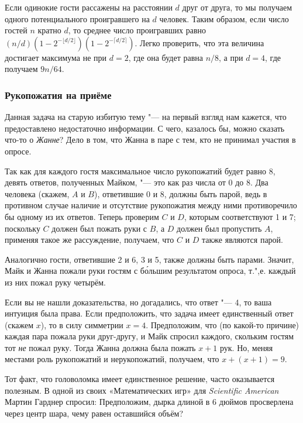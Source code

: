 \documentclass[twoside]{book}
\begin{document}
Если одинокие гости рассажены на расстоянии $d$ друг от друга, то мы получаем одного потенциального проигравшего на $d$ человек.
Таким образом, если число гостей $n$ кратно $d$, то среднее число проигравших равно $(n/d)(1-2^{-\lfloor d/2\rfloor})(1-2^{-\lceil d/2\rceil})$.
Легко проверить, что эта величина достигает максимума не при $d=2$, где она будет равна $n/8$, а при $d=4$, где получаем $9n/64$.
\heart

\subsubsection*{Рукопожатия на приёме}%

Данная задача на старую избитую тему "--- на первый взгляд нам кажется, что предоставлено недостаточно информации.
С чего, казалось бы, можно сказать что-то о \emph{Жанне}?
Дело в том, что Жанна в паре с тем, кто не принимал участия в опросе.

Так как для каждого гостя максимальное число рукопожатий будет равно 8, 
девять ответов, полученных Майком, "--- это как раз числа от 0 до 8.
Два человека (скажем, $A$ и $B$), ответившие 0 и 8, должны быть парой, ведь в противном случае наличие и отсутствие рукопожатия между ними противоречило бы одному из их ответов.
Теперь проверим $C$ и $D$, которым соответствуют 1 и 7;
поскольку $C$ должен был пожать руки с $B$, а $D$ должен был пропустить $A$, применяя такое же рассуждение, получаем, что $C$ и $D$ также являются парой.

Аналогично гости, ответившие 2 и 6, 3 и 5,
также должны быть парами.  Значит, Майк и Жанна пожали руки гостям с
б\'{о}льшим результатом опроса, т.",е. каждый из них пожал руку
четырём.  \heart

Если вы не нашли доказательства, но догадались, что ответ "--- 4, то ваша интуиция была права.
Если предположить, что задача имеет единственный ответ (скажем $x$), то в силу симметрии $x=4$.
Предположим, что (по какой-то причине) каждая пара пожала руки друг-другу, и Майк спросил каждого, скольким гостям тот \emph{не} пожал руку.
Тогда Жанна должна была пожать $x+1$ рук.
Но, меняя местами роль рукопожатий и нерукопожатий, получаем, что $x+(x+1)=9$.

Тот факт, что головоломка имеет единственное решение, часто оказывается полезным.
В одной из своих «Математических игр» для \emph{Scientific American} Мартин Гарднер спросил:
Предположим, дырка длиной в 6 дюймов просверлена через центр шара, чему равен оставшийся объём?
\end{document}
